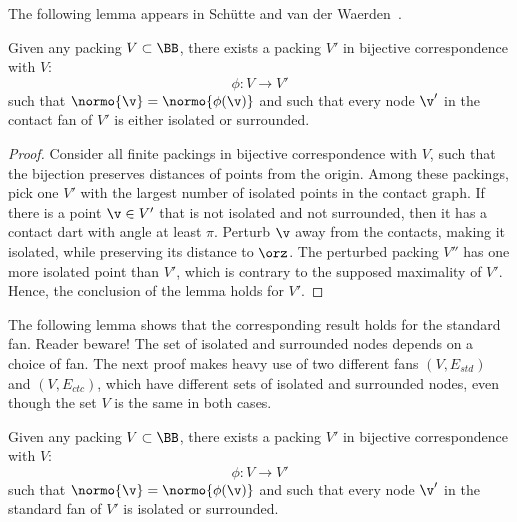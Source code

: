 The following lemma appears in Sch\"utte and van der
Waerden~\cite{vanderWaerden:1951}.

\begin{lemma}
Given any packing $V\subset \BB$,
there exists a  packing $V'$ 
in bijective correspondence with $V$:
\begin{displaymath}
\phi:V\to V'
\end{displaymath}
such that $\normo{\v} = \normo{\phi(\v)}$ and
such that every node $\v'$ in the contact fan of $V'$
is either isolated or surrounded.
\end{lemma}
%
%
%

\begin{proof} Consider all finite packings in bijective correspondence
  with $V$, such that the bijection preserves distances of points from
  the origin.  Among these packings, pick one $V'$ with the largest
  number of isolated points in the contact graph.  If there is a point
  $\v\in V'$ that is not isolated and not surrounded, then it has a
  contact dart with angle at least $\pi$.  Perturb $\v$ away from the
  contacts, making it isolated, while preserving its distance to
  $\orz$.  The perturbed packing $V''$ has one more isolated point
  than $V'$, which is contrary to the supposed maximality of $V'$.
  Hence, the conclusion of the lemma holds for $V'$.
\end{proof}

The following lemma shows that the corresponding result holds for the
standard fan.  Reader beware!  The set of isolated and surrounded
nodes depends on a choice of fan.  The next proof makes heavy use
of two different fans $(V,E_{std})$ and $(V,E_{ctc})$, which have
different sets of isolated and surrounded nodes, even though the
set $V$ is the same in both cases.



\begin{lemma}
\label{lemma:surrounded}  %
Given any packing $V\subset \BB$,
there exists a  packing $V'$ 
in bijective correspondence with $V$:
\begin{displaymath}
\phi:V\to V'
\end{displaymath}
such that $\normo{\v} = \normo{\phi(\v)}$ and
such that every node $\v'$ in the standard fan of $V'$
is isolated or surrounded.
%
\end{lemma}

